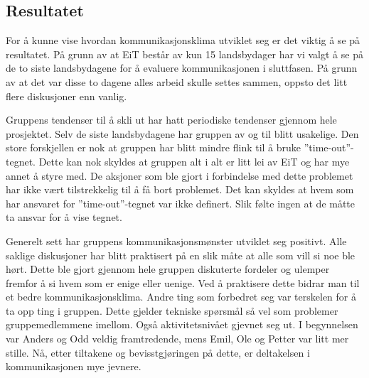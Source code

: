 \subsection{Resultatet}
For å kunne vise hvordan kommunikasjonsklima utviklet seg er det viktig å se på resultatet. 
På grunn av at EiT består av kun 15 landsbydager har vi valgt å se på de to siste landsbydagene for å evaluere kommunikasjonen i sluttfasen. 
På grunn av at det var disse to dagene alles arbeid skulle settes sammen, oppsto det litt flere diskusjoner enn vanlig. 
\vspace{\secspace}

Gruppens tendenser til å skli ut har hatt periodiske tendenser gjennom hele prosjektet. 
Selv de siste landsbydagene har gruppen av og til blitt usakelige. 
Den store forskjellen er nok at gruppen har blitt mindre flink til å bruke ''time-out''-tegnet. 
Dette kan nok skyldes at gruppen alt i alt er litt lei av EiT og har mye annet å styre med. 
De aksjoner som ble gjort i forbindelse med dette problemet har ikke vært tilstrekkelig til å få bort problemet. 
Det kan skyldes at hvem som har ansvaret for ''time-out''-tegnet var ikke definert.
Slik følte ingen at de måtte ta ansvar for å vise tegnet. 
\vspace{\secspace}

Generelt sett har gruppens kommunikasjonsmønster utviklet seg positivt. 
Alle saklige diskusjoner har blitt praktisert på en slik måte at alle som vill si noe ble hørt. 
Dette ble gjort gjennom hele gruppen diskuterte fordeler og ulemper fremfor å si hvem som er enige eller uenige. 
Ved å praktisere dette bidrar man til et bedre kommunikasjonsklima\citep{levin}.
Andre ting som forbedret seg var terskelen for å ta opp ting i gruppen. 
Dette gjelder tekniske spørsmål så vel som problemer gruppemedlemmene imellom. 
Også aktivitetsnivået gjevnet seg ut. 
I begynnelsen var Anders og Odd veldig framtredende, mens Emil, Ole og Petter var litt mer stille. 
Nå, etter tiltakene og bevisstgjøringen på dette, er deltakelsen i kommunikasjonen mye jevnere.  
\vspace{\secspace}
